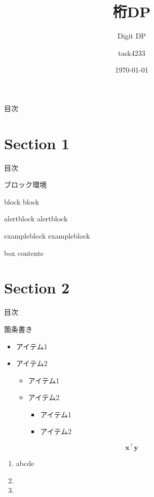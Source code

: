 \documentclass[aspectratio=169, dvipdfmx, 11pt]{beamer} %
\title[桁DP]{桁DP}
\subtitle{Digit DP}
\author{task4233}
\date{\today}
\begin{document}
\maketitle

\begin{frame}{目次}
    \tableofcontents
\end{frame}

\section{Section 1}
\begin{frame}{目次}
    \tableofcontents[currentsection]
\end{frame}

\begin{frame}{ブロック環境}
    \begin{block}{block}
    block
    \end{block}
    \begin{alertblock}{alertblock}
    alertblock
    \end{alertblock}
    \begin{exampleblock}{exampleblock}
    exampleblock
    \end{exampleblock}
    \begin{tcolorbox}[colframe=green,
    colback=green!10!white,
    colbacktitle=green!40!white,
    coltitle=black, fonttitle=\bfseries,
    title=My box]
        box contents
    \end{tcolorbox}
\end{frame}

\section{Section 2}
\begin{frame}{目次}
    \tableofcontents[currentsection]
\end{frame}

\begin{frame}{箇条書き}
    \begin{itemize}
    \item アイテム1
    \item \alert{アイテム2}
        \begin{itemize}
        \item アイテム1
        \item \alert{アイテム2}
            \begin{itemize}
            \item アイテム1
            \item \alert{アイテム2}
            \end{itemize}
        \end{itemize}
    \end{itemize}
    \[
    \bm{x}^\top\bm{y}
    \]
    \begin{enumerate}
    \item abcde
    \item {}
    \item 
    \end{enumerate}
\end{frame}
\end{document}
